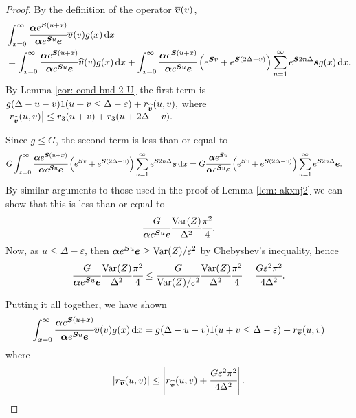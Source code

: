 \begin{proof}
	By the definition of the operator \(\overline{\boldsymbol v}(v)\), 
	\begin{align}
		&\int_{x=0}^\infty \cfrac{\boldsymbol \alpha  e^{\boldsymbol{S} (u+x)} }{\boldsymbol \alpha  e^{\boldsymbol{S} u} \boldsymbol e} \overline{\boldsymbol v}(v)g(x)\, \mathrm{d} x \nonumber		
		\\&= \int_{x=0}^\infty \cfrac{\boldsymbol \alpha  e^{\boldsymbol{S} (u+x)} }{\boldsymbol \alpha  e^{\boldsymbol{S} u} \boldsymbol e} {\widehat{\boldsymbol v}}(v)g(x)\, \mathrm{d} x + \int_{x=0}^\infty \cfrac{\boldsymbol \alpha  e^{\boldsymbol{S} (u+x)} }{\boldsymbol \alpha  e^{\boldsymbol{S} u} \boldsymbol e} \left(e^{\boldsymbol{S} v} + e^{\boldsymbol{S} (2\Delta-v)}\right)\sum_{n=1}^\infty e^{\boldsymbol S2n\Delta}\boldsymbol s g(x)\, \mathrm{d} x. \label{eqn: ghi is this a2}
	\end{align}
	By Lemma \ref{cor: cond bnd 2 U} the first term is 
	\(g(\Delta-u-v) 1(u+v\leq\Delta-\varepsilon) + r_{{\widehat{\boldsymbol v}}} (u,v),\)
	where 
	\(\left|r_{\widehat{\boldsymbol v}} (u,v)\right|\leq r_3 (u+v) + r_3 (u+2\Delta - v).\)

	Since \(g\leq G\), the second term is less than or equal to 
	\begin{align*}
		G\int_{x=0}^\infty \cfrac{\boldsymbol \alpha  e^{\boldsymbol{S} (u+x)} }{\boldsymbol \alpha  e^{\boldsymbol{S} u} \boldsymbol e} \left(e^{\boldsymbol{S} v} + e^{\boldsymbol{S} (2\Delta-v)}\right)\sum_{n=1}^\infty e^{\boldsymbol S2n\Delta}\boldsymbol s \, \mathrm{d} x
		&= G \cfrac{\boldsymbol \alpha  e^{\boldsymbol{S} u} }{\boldsymbol \alpha  e^{\boldsymbol{S} u} \boldsymbol e} \left(e^{\boldsymbol{S} v} + e^{\boldsymbol{S} (2\Delta-v)}\right)\sum_{n=1}^\infty e^{\boldsymbol S2n\Delta}\boldsymbol e.
	\end{align*}
	By similar arguments to those used in the proof of Lemma \ref{lem: akxnj2} we can show that this is less than or equal to 
	\begin{align*}
		\cfrac{G}{\boldsymbol \alpha  e^{\boldsymbol{S} u} \boldsymbol e} \cfrac{\mathrm{Var}(Z)}{\Delta^2}\cfrac{\pi^2}{4}.
	\end{align*}
	Now, as \(u\leq \Delta-\varepsilon\), then \(\boldsymbol\alpha e^{\boldsymbol Su}\boldsymbol e\geq \mathrm{Var}(Z)/\varepsilon^2\) by Chebyshev's inequality, hence 
	\begin{align*}
		\cfrac{G}{\boldsymbol \alpha  e^{\boldsymbol{S} u} \boldsymbol e} \cfrac{\mathrm{Var}(Z)}{\Delta^2}\cfrac{\pi^2}{4} \leq \cfrac{G}{\mathrm{Var}(Z)/\varepsilon^2} \cfrac{\mathrm{Var}(Z)}{\Delta^2}\cfrac{\pi^2}{4} = \cfrac{G \varepsilon^2 \pi^2}{4\Delta^2}.
	\end{align*}

	Putting it all together, we have shown 
	\begin{align}
		\int_{x=0}^\infty \cfrac{\boldsymbol \alpha  e^{\boldsymbol{S} (u+x)} }{\boldsymbol \alpha  e^{\boldsymbol{S} u} \boldsymbol e} \overline{\boldsymbol v}(v)g(x)\, \mathrm{d} x = g(\Delta-u-v) 1(u+v\leq\Delta-\varepsilon) + r_{\overline{\boldsymbol v}} (u,v)
	\end{align}
	where 
	\[|r_{\overline{\boldsymbol v}} (u,v)| \leq \left|r_{\widehat{\boldsymbol v}} (u,v) + \cfrac{G \varepsilon^2 \pi^2}{4\Delta^2}\right|.\]
	

\end{proof}
